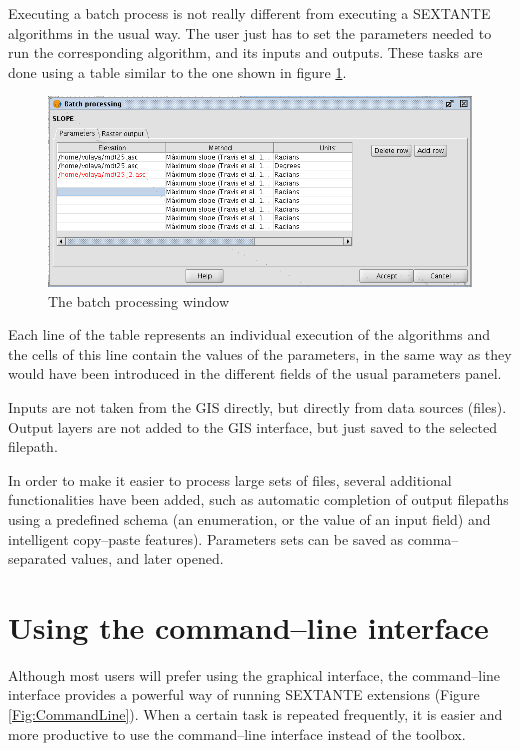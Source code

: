 \documentclass[12pt,a4paper,twocolumn]{article}
\begin{document}
Executing a batch process is not really different from executing a SEXTANTE algorithms in the usual way. The user just has to set the parameters needed to run the corresponding algorithm, and its inputs and outputs. These tasks are done using a table similar to the one shown in figure \ref{Fig:BatchProcess}. 

\begin{figure} [!hbt]
 \centering
 \includegraphics[width=\columnwidth]{BatchProcess.png}
\caption{The batch processing window}
\label{Fig:BatchProcess}
\end{figure}

Each line of the table  represents  an individual execution of the algorithms and the cells of this line contain the values of the parameters, in the same way as they would have been introduced in the different fields of the usual parameters panel.

Inputs are not taken from the GIS directly, but directly from data sources (files). Output layers are not added to the GIS interface, but just saved to the selected filepath.

In order to make it easier to process large sets of files, several additional functionalities have been added, such as automatic completion of output filepaths using a predefined schema (an enumeration, or the value of an input field) and intelligent copy--paste features). Parameters sets can be saved as comma--separated values, and later opened.

\section{Using the command--line interface}

Although most users will prefer using the graphical interface, the command--line interface provides a powerful way of running SEXTANTE extensions (Figure \ref{Fig:CommandLine}). When a certain task is repeated frequently, it is easier and more productive to use the command--line interface instead of the toolbox.
\end{document}
